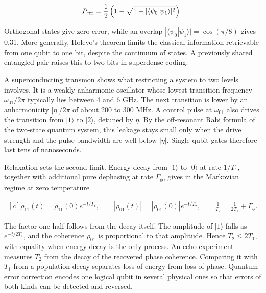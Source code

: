 \documentclass[11pt,oneside]{book}
\newenvironment{centeredalign}{\[\begin{gathered}[c]}{\end{gathered}\]}
\newcommand{\ket}[1]{\lvert #1\rangle}
\begin{document}
\begin{centeredalign}
P_{\rm err}=\frac12\left(1-\sqrt{1-|\langle\psi_0|\psi_1\rangle|^2}\right).
\end{centeredalign}

Orthogonal states give zero error, while an overlap \(|\langle\psi_0|\psi_1\rangle|=\cos(\pi/8)\) gives 0.31. More generally, Holevo's theorem limits the classical information retrievable from one qubit to one bit, despite the continuum of states. A previously shared entangled pair raises this to two bits in superdense coding.

A superconducting transmon shows what restricting a system to two levels involves. It is a weakly anharmonic oscillator whose lowest transition frequency \(\omega_{01}/2\pi\) typically lies between 4 and 6 GHz. The next transition is lower by an anharmonicity \(|\eta|/2\pi\) of about 200 to 300 MHz. A control pulse at \(\omega_{01}\) also drives the transition from \(\ket1\) to \(\ket2\), detuned by \(\eta\). By the off-resonant Rabi formula of the two-state quantum system, this leakage stays small only when the drive strength and the pulse bandwidth are well below \(|\eta|\). Single-qubit gates therefore last tens of nanoseconds.

Relaxation sets the second limit. Energy decay from \(\ket1\) to \(\ket0\) at rate \(1/T_1\), together with additional pure dephasing at rate \(\Gamma_\phi\), gives in the Markovian regime at zero temperature

\begin{centeredalign}
\rho_{11}(t)=\rho_{11}(0)e^{-t/T_1},\qquad |\rho_{01}(t)|=|\rho_{01}(0)|e^{-t/T_2},
\qquad \frac{1}{T_2}=\frac{1}{2T_1}+\Gamma_\phi.
\end{centeredalign}

The factor one half follows from the decay itself. The amplitude of \(\ket1\) falls as \(e^{-t/2T_1}\), and the coherence \(\rho_{01}\) is proportional to that amplitude. Hence \(T_2\leq2T_1\), with equality when energy decay is the only process. An echo experiment measures \(T_2\) from the decay of the recovered phase coherence. Comparing it with \(T_1\) from a population decay separates loss of energy from loss of phase. Quantum error correction encodes one logical qubit in several physical ones so that errors of both kinds can be detected and reversed.
\end{document}
